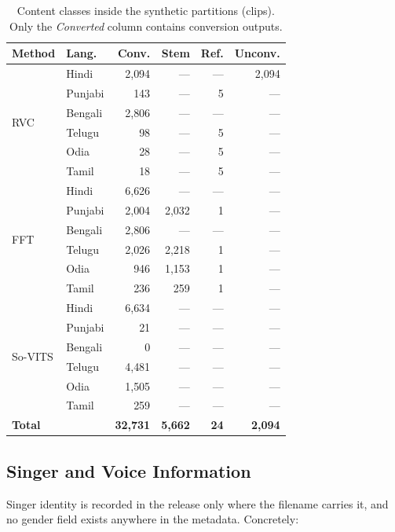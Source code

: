 \documentclass[conference]{IEEEtran}
\begin{document}
\begin{table}[t]
\centering
\caption{Content classes inside the synthetic partitions (clips). Only the
\emph{Converted} column contains conversion outputs.}
\label{tab:s3}
\scriptsize
\setlength{\tabcolsep}{3pt}
\begin{tabular}{llrrrr}
\toprule
\textbf{Method} & \textbf{Lang.} & \textbf{Conv.} & \textbf{Stem} & \textbf{Ref.} & \textbf{Unconv.} \\
\midrule
\multirow{6}{*}{RVC}
 & Hindi   & 2{,}094 & --- & --- & 2{,}094 \\
 & Punjabi &   143 & --- &  5 & --- \\
 & Bengali & 2{,}806 & --- & --- & --- \\
 & Telugu  &    98 & --- &  5 & --- \\
 & Odia    &    28 & --- &  5 & --- \\
 & Tamil   &    18 & --- &  5 & --- \\
\midrule
\multirow{6}{*}{FFT}
 & Hindi   & 6{,}626 & --- & --- & --- \\
 & Punjabi & 2{,}004 & 2{,}032 &  1 & --- \\
 & Bengali & 2{,}806 & --- & --- & --- \\
 & Telugu  & 2{,}026 & 2{,}218 &  1 & --- \\
 & Odia    &   946 & 1{,}153 &  1 & --- \\
 & Tamil   &   236 &   259 &  1 & --- \\
\midrule
\multirow{6}{*}{So-VITS}
 & Hindi   & 6{,}634 & --- & --- & --- \\
 & Punjabi &    21 & --- & --- & --- \\
 & Bengali &     0 & --- & --- & --- \\
 & Telugu  & 4{,}481 & --- & --- & --- \\
 & Odia    & 1{,}505 & --- & --- & --- \\
 & Tamil   &   259 & --- & --- & --- \\
\midrule
\multicolumn{2}{l}{\textbf{Total}} & \textbf{32{,}731} & \textbf{5{,}662} & \textbf{24} & \textbf{2{,}094} \\
\bottomrule
\end{tabular}
\end{table}

\subsection{Singer and Voice Information}
\label{sec:singers}
Singer identity is recorded in the release only where the filename carries it, and no
gender field exists anywhere in the metadata. Concretely:
\end{document}
